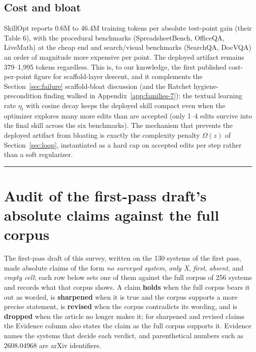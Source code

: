 \documentclass[
  11pt,
]{article}
\begin{document}
\subsection{Cost and bloat}\label{app:families-11}

SkillOpt reports 0.6M to 46.4M training tokens per absolute test-point gain (their Table 6), with the procedural benchmarks (SpreadsheetBench, OfficeQA, LiveMath) at the cheap end and search/visual benchmarks (SearchQA, DocVQA) an order of magnitude more expensive per point. The deployed artifact remains 379--1,995 tokens regardless. This is, to our knowledge, the first published cost-per-point figure for scaffold-layer descent, and it complements the Section~\ref{sec:failure} scaffold-bloat discussion (and the Ratchet hygiene-precondition finding walked in Appendix~\ref{app:families-7}): the textual learning rate \(\eta_t\) with cosine decay keeps the deployed skill compact even when the optimizer explores many more edits than are accepted (only 1--4 edits survive into the final skill across the six benchmarks). The mechanism that prevents the deployed artifact from bloating is exactly the complexity penalty \(\Omega(z)\) of Section~\ref{sec:loop}, instantiated as a hard cap on accepted edits per step rather than a soft regularizer.

\begin{center}\rule{0.5\linewidth}{0.5pt}\end{center}

\section{Audit of the first-pass draft's absolute claims against the full corpus}\label{app:audit}

The first-pass draft of this survey, written on the 130 systems of the first pass, made absolute claims of the form \emph{no surveyed system}, \emph{only X}, \emph{first}, \emph{absent}, and \emph{empty cell}; each row below sets one of them against the full corpus of 256 systems and records what that corpus shows. A claim \textbf{holds} when the full corpus bears it out as worded, is \textbf{sharpened} when it is true and the corpus supports a more precise statement, is \textbf{revised} when the corpus contradicts its wording, and is \textbf{dropped} when the article no longer makes it; for sharpened and revised claims the Evidence column also states the claim as the full corpus supports it. Evidence names the systems that decide each verdict, and parenthetical numbers such as 2608.04968 are arXiv identifiers.
\end{document}
